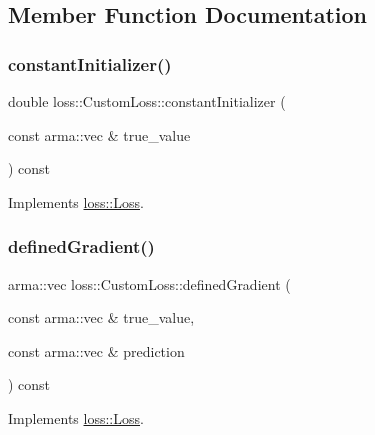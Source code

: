 \subsection{Member Function Documentation}
\mbox{\label{classloss_1_1_custom_loss_adf283025a8511731504cd5b620cc8b37}} 
\subsubsection{\texorpdfstring{constant\+Initializer()}{constantInitializer()}}
{\footnotesize\ttfamily double loss\+::\+Custom\+Loss\+::constant\+Initializer (\begin{DoxyParamCaption}\item[{const arma\+::vec \&}]{true\+\_\+value }\end{DoxyParamCaption}) const\hspace{0.3cm}{\ttfamily [virtual]}}



Implements \mbox{\hyperlink{classloss_1_1_loss_a65fe7dcd9370e6a549b8d1cc95fc8798}{loss\+::\+Loss}}.

\mbox{\label{classloss_1_1_custom_loss_a3a79dc019e781c2956b52fb8e1cfcc56}} 
\subsubsection{\texorpdfstring{defined\+Gradient()}{definedGradient()}}
{\footnotesize\ttfamily arma\+::vec loss\+::\+Custom\+Loss\+::defined\+Gradient (\begin{DoxyParamCaption}\item[{const arma\+::vec \&}]{true\+\_\+value,  }\item[{const arma\+::vec \&}]{prediction }\end{DoxyParamCaption}) const\hspace{0.3cm}{\ttfamily [virtual]}}



Implements \mbox{\hyperlink{classloss_1_1_loss_a267a4de70747ade4b2d84ce35a448979}{loss\+::\+Loss}}.

